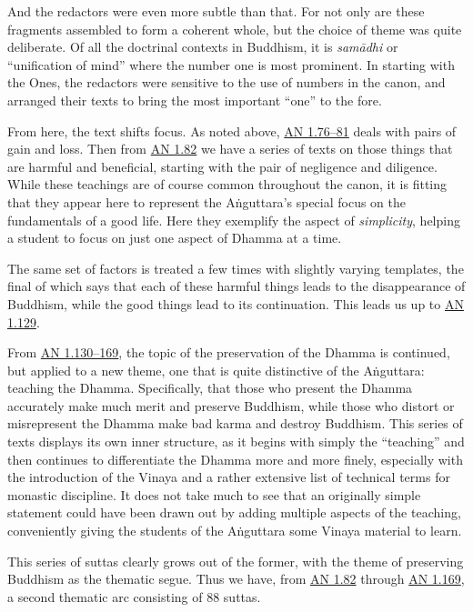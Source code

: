 \documentclass[12pt,openany]{book}%
\begin{document}
And the redactors were even more subtle than that. For not only are these fragments assembled to form a coherent whole, but the choice of theme was quite deliberate. Of all the doctrinal contexts in Buddhism, it is \textit{\textsanskrit{samādhi}} or “unification of mind” where the number one is most prominent. In starting with the Ones, the redactors were sensitive to the use of numbers in the canon, and arranged their texts to bring the most important “one” to the fore.

From here, the text shifts focus. As noted above, \href{https://suttacentral.net/an1.71{-}81}{AN 1.76–81} deals with pairs of gain and loss. Then from \href{https://suttacentral.net/an1.82{-}97}{AN 1.82} we have a series of texts on those things that are harmful and beneficial, starting with the pair of negligence and diligence. While these teachings are of course common throughout the canon, it is fitting that they appear here to represent the \textsanskrit{Aṅguttara}’s special focus on the fundamentals of a good life. Here they exemplify the aspect of \emph{simplicity}, helping a student to focus on just one aspect of Dhamma at a time.

The same set of factors is treated a few times with slightly varying templates, the final of which says that each of these harmful things leads to the disappearance of Buddhism, while the good things lead to its continuation. This leads us up to \href{https://suttacentral.net/an1.98{-}139}{AN 1.129}.

From \href{https://suttacentral.net/an1.98{-}139}{AN 1.130–169}, the topic of the preservation of the Dhamma is continued, but applied to a new theme, one that is quite distinctive of the \textsanskrit{Aṅguttara}: teaching the Dhamma. Specifically, that those who present the Dhamma accurately make much merit and preserve Buddhism, while those who distort or misrepresent the Dhamma make bad karma and destroy Buddhism. This series of texts displays its own inner structure, as it begins with simply the “teaching” and then continues to differentiate the Dhamma more and more finely, especially with the introduction of the Vinaya and a rather extensive list of technical terms for monastic discipline. It does not take much to see that an originally simple statement could have been drawn out by adding multiple aspects of the teaching, conveniently giving the students of the \textsanskrit{Aṅguttara} some Vinaya material to learn.

This series of suttas clearly grows out of the former, with the theme of preserving Buddhism as the thematic segue. Thus we have, from \href{https://suttacentral.net/an1.82{-}97}{AN 1.82} through \href{https://suttacentral.net/an1.150{-}169}{AN 1.169}, a second thematic arc consisting of 88 suttas.
\end{document}
